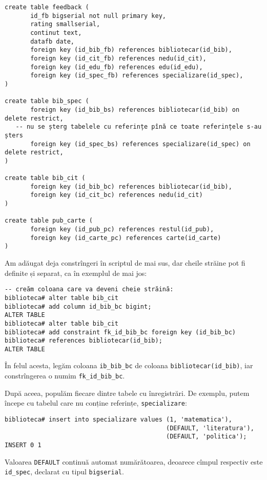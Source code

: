 \begin{verbatim}
create table feedback (
	   id_fb bigserial not null primary key,
	   rating smallserial,
	   continut text,
	   datafb date,
	   foreign key (id_bib_fb) references bibliotecar(id_bib),
	   foreign key (id_cit_fb) references nedu(id_cit),
	   foreign key (id_edu_fb) references edu(id_edu),
	   foreign key (id_spec_fb) references specializare(id_spec),
)

create table bib_spec (
	   foreign key (id_bib_bs) references bibliotecar(id_bib) on delete restrict,
   -- nu se șterg tabelele cu referințe pînă ce toate referințele s-au șters
	   foreign key (id_spec_bs) references specializare(id_spec) on delete restrict,
)

create table bib_cit (
	   foreign key (id_bib_bc) references bibliotecar(id_bib),
	   foreign key (id_cit_bc) references nedu(id_cit)
)

create table pub_carte (
	   foreign key (id_pub_pc) references restul(id_pub),
	   foreign key (id_carte_pc) references carte(id_carte)
)
\end{verbatim}

Am adăugat deja constrîngeri în scriptul de mai sus, dar cheile străine
pot fi definite și separat, ca în exemplul de mai jos:

\begin{verbatim}
-- creăm coloana care va deveni cheie străină:
biblioteca# alter table bib_cit
biblioteca# add column id_bib_bc bigint;
ALTER TABLE
biblioteca# alter table bib_cit
biblioteca# add constraint fk_id_bib_bc foreign key (id_bib_bc) 
biblioteca# references bibliotecar(id_bib);
ALTER TABLE
\end{verbatim}

În felul acesta, legăm coloana \texttt{ib\_bib\_bc} de coloana \texttt{bibliotecar(id\_bib)},
iar constrîngerea o numim \texttt{fk\_id\_bib\_bc}.

După aceea, populăm fiecare dintre tabele cu înregistrări. De exemplu,
putem începe cu tabelul care nu conține referințe, \texttt{specializare}:

\begin{verbatim}
biblioteca# insert into specializare values (1, 'matematica'), 
                                            (DEFAULT, 'literatura'),
                                            (DEFAULT, 'politica');
INSERT 0 1
\end{verbatim}

Valoarea \texttt{DEFAULT} continuă automat numărătoarea, deoarece
cîmpul respectiv este \texttt{id\_spec}, declarat cu tipul \texttt{bigserial}.




